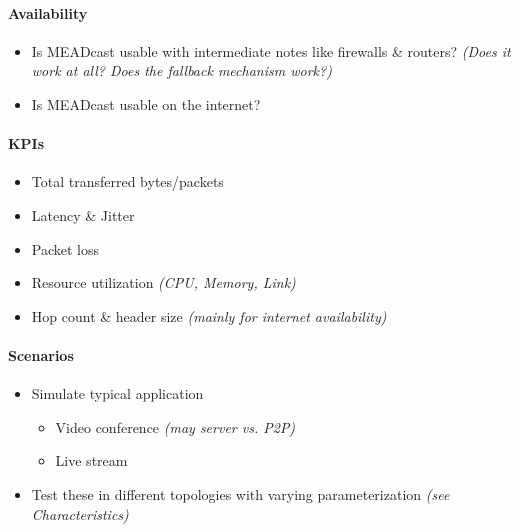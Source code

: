 \paragraph{Availability} %
\label{par:Availability}
\begin{itemize}
    \item Is MEADcast usable with intermediate notes like firewalls \& routers?
        \textit{(Does it work at all? Does the fallback mechanism work?)}
    \item Is MEADcast usable on the internet?
\end{itemize}

\paragraph{KPIs} %
\label{par:KPIs}
\begin{itemize}
    \item Total transferred bytes/packets
    \item Latency \& Jitter
    \item Packet loss
    \item Resource utilization \textit{(CPU, Memory, Link)}
    \item Hop count \& header size \textit{(mainly for internet availability)}
\end{itemize}

\paragraph{Scenarios} %
\label{par:Scenarios}
\begin{itemize}
    \item Simulate typical application
    \begin{itemize}
        \item Video conference \textit{(may server vs. P2P)}
        \item Live stream
    \end{itemize}
    \item Test these in different topologies with varying parameterization
        \textit{(see Characteristics)}
\end{itemize}

